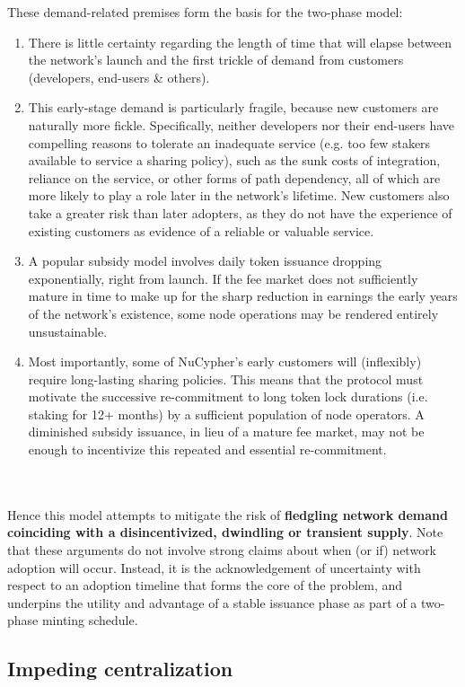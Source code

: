 \documentclass[8pt]{article}
\begin{document}
These demand-related premises form the basis for the two-phase model: 
\begin{enumerate}
\item There is little certainty regarding the length of time that will elapse between the network's launch and the first trickle of demand from customers (developers, end-users \& others).
\item This early-stage demand is particularly fragile, because new customers are naturally more fickle. Specifically, neither developers nor their end-users have compelling reasons to tolerate an inadequate service (e.g. too few stakers available to service a sharing policy), such as the sunk costs of integration, reliance on the service, or other forms of path dependency, all of which are more likely to play a role later in the network's lifetime. New customers also take a greater risk than later adopters, as they do not have the experience of existing customers as evidence of a reliable or valuable service.
\item A popular subsidy model involves daily token issuance dropping exponentially, right from launch. If the fee market does not sufficiently mature in time to make up for the sharp reduction in earnings the early years of the network's existence, some node operations may be rendered entirely unsustainable. 
\item Most importantly, some of NuCypher's early customers will (inflexibly) require long-lasting sharing policies. This means that the protocol must motivate the successive re-commitment to long token lock durations (i.e. staking for 12+ months) by a sufficient population of node operators. A diminished subsidy issuance, in lieu of a mature fee market, may not be enough to incentivize this repeated and essential re-commitment. 
\end{enumerate}

\\\\
Hence this model attempts to mitigate the risk of \textbf{fledgling network demand coinciding with a disincentivized, dwindling or transient supply}. Note that these arguments do not involve strong claims about when (or if) network adoption will occur. Instead, it is the acknowledgement of uncertainty with respect to an adoption timeline that forms the core of the problem, and underpins the utility and advantage of a stable issuance phase as part of a two-phase minting schedule. 

\subsection{Impeding centralization}
\end{document}

